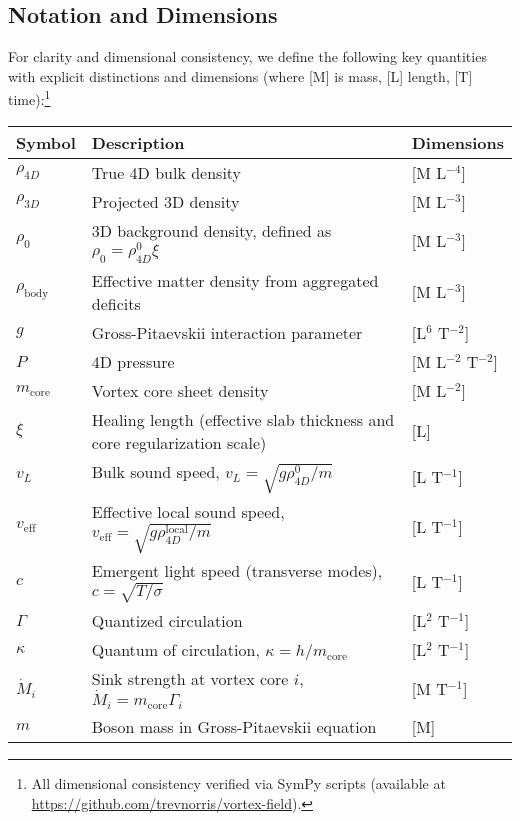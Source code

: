 \subsection{Notation and Dimensions}

For clarity and dimensional consistency, we define the following key quantities with explicit distinctions and dimensions (where [M] is mass, [L] length, [T] time):\footnote{All dimensional consistency verified via SymPy scripts (available at \url{https://github.com/trevnorris/vortex-field}).}

\begin{table}[H]
\centering
\begin{tabular}{|l|l|l|}
\hline
Symbol & Description & Dimensions \\
\hline
$\rho_{4D}$ & True 4D bulk density & [M L$^{-4}$] \\
\hline
$\rho_{3D}$ & Projected 3D density & [M L$^{-3}$] \\
\hline
$\rho_0$ & 3D background density, defined as $\rho_0 = \rho_{4D}^0 \xi$ & [M L$^{-3}$] \\
\hline
$\rho_{\text{body}}$ & Effective matter density from aggregated deficits & [M L$^{-3}$] \\
\hline
$g$ & Gross-Pitaevskii interaction parameter & [L$^6$ T$^{-2}$] \\
\hline
$P$ & 4D pressure & [M L$^{-2}$ T$^{-2}$] \\
\hline
$m_{\text{core}}$ & Vortex core sheet density & [M L$^{-2}$] \\
\hline
$\xi$ & Healing length (effective slab thickness and core regularization scale) & [L] \\
\hline
$v_L$ & Bulk sound speed, $v_L = \sqrt{g \rho_{4D}^0 / m}$ & [L T$^{-1}$] \\
\hline
$v_{\text{eff}}$ & Effective local sound speed, $v_{\text{eff}} = \sqrt{g \rho_{4D}^{\text{local}} / m}$ & [L T$^{-1}$] \\
\hline
$c$ & Emergent light speed (transverse modes), $c = \sqrt{T / \sigma}$ & [L T$^{-1}$] \\
\hline
$\Gamma$ & Quantized circulation & [L$^2$ T$^{-1}$] \\
\hline
$\kappa$ & Quantum of circulation, $\kappa = h / m_{\text{core}}$ & [L$^2$ T$^{-1}$] \\
\hline
$\dot{M}_i$ & Sink strength at vortex core $i$, $\dot{M}_i = m_{\text{core}} \Gamma_i$ & [M T$^{-1}$] \\
\hline
$m$ & Boson mass in Gross-Pitaevskii equation & [M] \\

\end{tabular}
\end{table}
